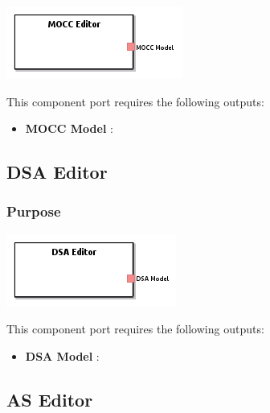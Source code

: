 \documentclass{gemoc} %
\begin{document}
\begin{center}
\includegraphics*[trim=0.0cm 0.0cm 0cm 0.0cm, clip=true]{../images/generated/Generated_MOCC_Editor.png}
\end{center}


This component port requires the following outputs:
\begin{itemize}
  \item \textbf{MOCC Model} :
\end{itemize}

\subsection{DSA Editor}


\subsubsection{Purpose}

\begin{center}
\includegraphics*[trim=0.0cm 0.0cm 0cm 0.0cm, clip=true]{../images/generated/Generated_DSA_Editor.png}
\end{center}


This component port requires the following outputs:
\begin{itemize}
  \item \textbf{DSA Model} :
\end{itemize}

\subsection{AS Editor}
\end{document}
